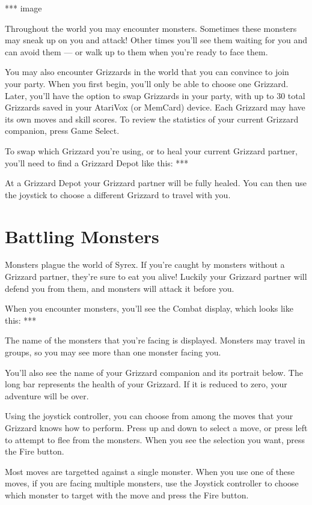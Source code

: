 \documentclass[10pt,twoside,openright]{memoir}
\begin{document}
*** image

Throughout  the  world  you  may  encounter  monsters.  Sometimes  these
monsters may  sneak up on  you and attack!  Other times you'll  see them
waiting for you  and can avoid them  --- or walk up to  them when you're
ready to face them.

You may also  encounter Grizzards in the world that  you can convince to
join your party. When you first begin, you'll only be able to choose one
Grizzard. Later, you'll have the option to swap Grizzards in your party,
with  up to  30  total Grizzards  saved in  your  AtariVox (or  MemCard)
device. Each Grizzard may have its own moves and skill scores. To review
the statistics of your current Grizzard companion, press Game Select.

To swap which Grizzard you're using, or to heal your current Grizzard
partner, you'll need to find a Grizzard Depot like this: ***

At a Grizzard Depot your Grizzard partner will be fully healed. You can
then use the joystick to choose a different Grizzard to travel with you.


\section{Battling Monsters}

Monsters plague the world of Syrex. If you're caught by monsters without a
Grizzard partner, they're sure to eat you alive! Luckily your Grizzard
partner will defend you from them, and monsters will attack it before you.

When you encounter monsters, you'll see the Combat display, which looks like
this: ***

The name of the monsters that you're facing is displayed. Monsters may
travel in groups, so you may see more than one monster facing you.

You'll also see the name of your Grizzard companion and its portrait below.
The long bar represents the health of your Grizzard. If it is reduced to
zero, your adventure will be over.

Using the joystick controller, you can choose from among the moves that your
Grizzard knows how to perform. Press up and down to select a move, or press
left to attempt to flee from the monsters. When you see the selection you
want, press the Fire button.

Most moves are targetted against a single monster.  When you use one of
these moves, if you are facing multiple monsters, use the Joystick
controller to choose which monster to target with the move and press the
Fire button.
\end{document}
